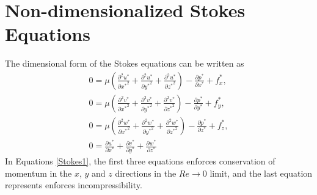 \documentclass[10pt,a4paper]{article}
\def\non{\nonumber}
\def\p{\partial}
\begin{document}
\section{Non-dimensionalized Stokes Equations}
The dimensional form of the Stokes equations can be written as
\begin{eqnarray}\label{Stokes1}
	0 = \mu \left( \frac{\p^2 u^*}{\p {x^*}^2}+\frac{\p^2 u^*}{\p {y^*}^2}+\frac{\p^2 u^*}{\p {z^*}^2} \right) - \frac{\p p^*}{\p {x^*}} + f_x^*, \non \\
	0 = \mu \left( \frac{\p^2 v^*}{\p {x^*}^2}+\frac{\p^2 v^*}{\p {y^*}^2}+\frac{\p^2 v^*}{\p {z^*}^2} \right) - \frac{\p p^*}{\p {y^*}} + f_y^*, \non \\
	0 = \mu \left( \frac{\p^2 w^*}{\p {x^*}^2}+\frac{\p^2 w^*}{\p {y^*}^2}+\frac{\p^2 w^*}{\p {z^*}^2} \right) - \frac{\p p^*}{\p {z^*}} + f_z^*, \non \\
	0 =  \frac{\p u^*}{\p {x^*}}+\frac{\p v^*}{\p {y^*}}+\frac{\p w^*}{\p {z^*}} 
\end{eqnarray}
In Equations \ref{Stokes1}, the first three equations enforces conservation of momentum in the $x$, $y$ and $z$ directions in the $Re \rightarrow 0$ limit, and the last equation represents enforces incompressibility.
\end{document}
